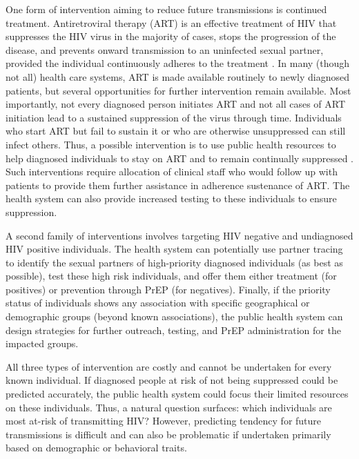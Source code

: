 \documentclass[a4paper,10pt]{article}
\begin{document}
One form of intervention aiming to reduce future transmissions is continued treatment. 
Antiretroviral therapy (ART) is an effective treatment of HIV that suppresses the HIV virus in the majority of cases, stops the progression of the disease, and prevents onward transmission to an uninfected sexual partner, provided the individual continuously adheres to the treatment \supercite{Cohen2011}.
In  many (though not all) health care systems, ART is made available routinely  to newly diagnosed patients, but several opportunities for further intervention remain available. 
Most importantly, not every diagnosed person initiates ART and not all cases of ART initiation lead to a sustained suppression of the virus through time. 
Individuals who start ART but fail to sustain it or who are otherwise unsuppressed can still infect others. 
Thus, a possible intervention is to use public health resources to help diagnosed individuals to stay on ART and to remain continually suppressed \supercite{Poon2016}. 
Such interventions require allocation of clinical staff who would follow up with patients to provide them further assistance in adherence sustenance of ART.
The health system can also provide  increased testing to these individuals to ensure suppression.  

A second family of interventions involves targeting HIV negative and undiagnosed HIV positive individuals.
The health system can potentially use partner tracing \supercite{Gotz2014} to identify the sexual partners of high-priority diagnosed individuals (as best as possible), test these high risk individuals, and offer them either treatment (for positives) or prevention through PrEP (for negatives). 
Finally, if the  priority status of individuals shows any association with specific geographical or demographic groups (beyond known associations), the public health system can design strategies for further outreach, testing, and PrEP administration for the impacted groups.

All three types of intervention   are  costly and cannot be undertaken for every known individual.
If diagnosed people at risk of not being suppressed could be predicted accurately, the public health system could focus their limited resources on these individuals.
Thus, a natural question surfaces: which individuals are most at-risk of transmitting HIV? %
However, predicting tendency for future transmissions is difficult and can also be problematic if undertaken primarily based on demographic or behavioral traits.
\end{document}
